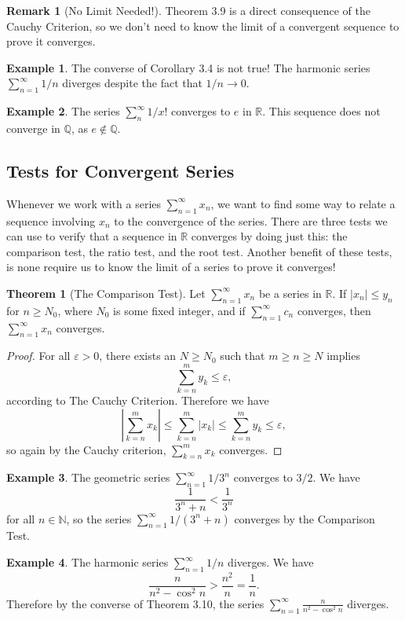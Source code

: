 \documentclass{article}
\newcommand{\N}{\mathbb{N}}
\newcommand{\R}{\mathbb{R}}
\newcommand{\Q}{\mathbb{Q}}
\theoremstyle{definition}
\newtheorem{theorem}{Theorem}[section]
\newtheorem{example}{Example}[section]
\newtheorem{remark}{Remark}[section]
\begin{document}
	\begin{remark}[No Limit Needed!]
		Theorem 3.9 is a direct consequence of the Cauchy Criterion, so we don't need to know the limit of a convergent sequence to prove it converges. 
	\end{remark}
	\begin{example}
		The converse of Corollary 3.4 is not true! The harmonic series $ \sum_{n=1}^{\infty} 1/n$ diverges despite the fact that $ 1/n\to 0 $. 
	\end{example}
	
	
	\begin{example}
		The series $ \sum_{n}^{\infty}1/x! $ converges to $ e $ in $ \R $. This sequence does not converge in $ \Q $, as $ e\notin \Q $. 
	\end{example}
	\subsection{Tests for Convergent Series}
	Whenever we work with a series $ \sum_{n=1}^{\infty}x_n $, we want to find some way to relate a sequence involving $ x_n $ to the convergence of the series. There are three tests we can use to verify that a sequence in $ \R $ converges by doing just this: the comparison test, the ratio test, and the root test. Another benefit of these tests, is none require us to know the limit of a series to prove it converges! 
	\begin{theorem}[The Comparison Test]
		Let $ \sum_{n=1}^{\infty}x_n  $ be a series in $ \R $. If $ |x_n|\le y_n $ for $ n\ge N_0 $, where $ N_0 $ is some fixed integer, and if $ \sum_{n=1}^{\infty}c_n $ converges, then $ \sum_{n=1}^\infty x_n $ converges.
	\end{theorem}
	\begin{proof}
		For all $ \varepsilon>0 $, there exists an $ N\ge N_0 $ such that $ m\ge n\ge N $ implies $$ \sum_{k=n}^{m}y_k\le \varepsilon  ,$$ according to The Cauchy Criterion. Therefore we have $$ \left\lvert\sum_{k=n}^{m}x_k \right\rvert\le\sum_{k=n}^{m}|x_k|\le\sum_{k=n}^{m}y_k\le \varepsilon,  $$ so again by the Cauchy criterion, $\sum_{k=n}^{m}x_k  $ converges. 
	\end{proof}
	\begin{example}
		The geometric series $ \sum_{n=1}^{\infty}1/3^n $ converges to $ 3/2 $. We have $$\frac{1}{3^n+n}<\frac{1}{3^n} $$ for all $ n\in\N $, so the series $ \sum_{n=1}^{\infty}1/(3^n+n) $ converges by the Comparison Test.
	\end{example}
	\begin{example}
		The harmonic series $ \sum_{n=1}^{\infty}1/n  $ diverges. We have $$\frac{n}{n^2-\cos^2 n}>\frac{n^2}{n}=\frac{1}{n}.$$	Therefore by the converse of Theorem 3.10, the series $ \sum_{n=1}^{\infty}\frac{n}{n^2-\cos^2 n} $ diverges.
	\end{example}
	
\end{document}
